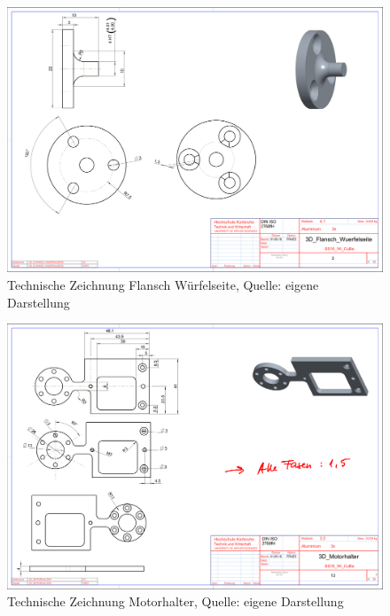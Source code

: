 \begin{landscape}
	\begin{figure} 
	\begin{center}
	\includegraphics[width=1.5\textwidth]{img/3d_flansch_wuerfelseite.pdf}
	\end{center}
	\caption{Technische Zeichnung Flansch Würfelseite, Quelle: eigene Darstellung}
	\end{figure}
	
	\begin{figure} 
	\begin{center}
	\includegraphics[width=1.5\textwidth]{img/3d_motorhalter.pdf}
	\end{center}
	\caption{Technische Zeichnung Motorhalter, Quelle: eigene Darstellung}
	\end{figure} 
	

\end{landscape}
